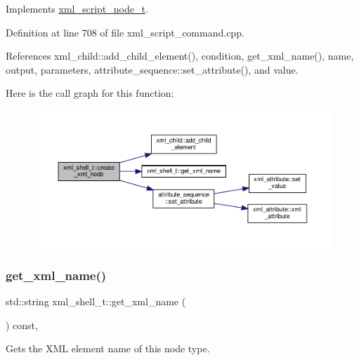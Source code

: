 Implements \hyperlink{classxml__script__node__t_adaf9c51a079c4617f3845c6133eb477f}{xml\+\_\+script\+\_\+node\+\_\+t}.



Definition at line 708 of file xml\+\_\+script\+\_\+command.\+cpp.



References xml\+\_\+child\+::add\+\_\+child\+\_\+element(), condition, get\+\_\+xml\+\_\+name(), name, output, parameters, attribute\+\_\+sequence\+::set\+\_\+attribute(), and value.

Here is the call graph for this function\+:
\nopagebreak
\begin{figure}[H]
\begin{center}
\leavevmode
\includegraphics[width=350pt]{dc/d20/classxml__shell__t_a8e65fb9948e3fdc63e370de8c67cfefc_cgraph}
\end{center}
\end{figure}
\mbox{\label{classxml__shell__t_a5a9787981f0f16d4182a21cca3b14916}} 
\subsubsection{\texorpdfstring{get\+\_\+xml\+\_\+name()}{get\_xml\_name()}}
{\footnotesize\ttfamily std\+::string xml\+\_\+shell\+\_\+t\+::get\+\_\+xml\+\_\+name (\begin{DoxyParamCaption}{ }\end{DoxyParamCaption}) const\hspace{0.3cm}{\ttfamily [override]}, {\ttfamily [virtual]}}



Gets the X\+ML element name of this node type. 



